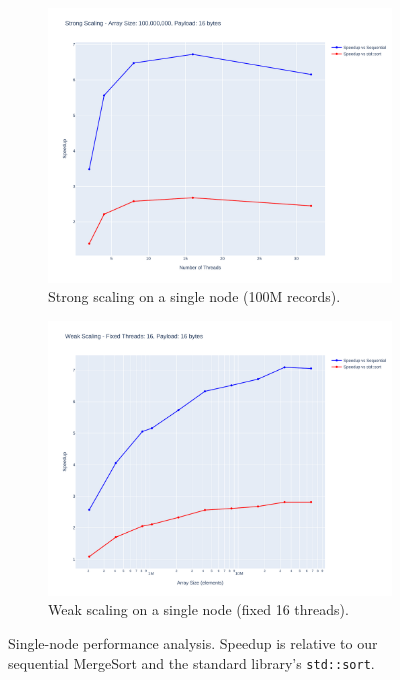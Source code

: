 \documentclass[10pt]{article}
\newcommand{\code}[1]{\texttt{#1}}
\begin{document}
\begin{figure}[H]
    \centering
    \begin{subfigure}{0.49\textwidth}
        \includegraphics[width=\linewidth]{../python/plots/strong_scaling.pdf}
        \caption{Strong scaling on a single node (100M records).}
        \label{fig:strong_scaling}
    \end{subfigure}
    \hfill
    \begin{subfigure}{0.49\textwidth}
        \includegraphics[width=\linewidth]{../python/plots/weak_scaling.pdf}
        \caption{Weak scaling on a single node (fixed 16 threads).}
        \label{fig:weak_scaling}
    \end{subfigure}
    \caption{Single-node performance analysis. Speedup is relative to our sequential MergeSort and the standard library's \code{std::sort}.}
    \label{fig:scaling_single_node}
\end{figure}
\end{document}
